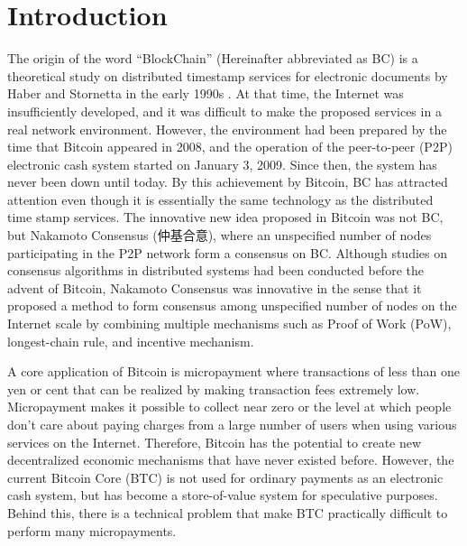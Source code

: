 \documentclass[graybox]{svmult}
\begin{document}
\section{Introduction}
\label{sec:intro}
The origin of the word ``BlockChain'' (Hereinafter abbreviated as BC) is a theoretical study on distributed timestamp services for electronic documents by Haber and Stornetta in the early 1990s
\cite{HS1991,BHS1993,HS1997}.
At that time, the Internet was insufficiently developed, and it was difficult to make the proposed services in a real network environment.
However, the environment had been prepared by the time that Bitcoin \cite{nakamoto} appeared in 2008, and the operation of the peer-to-peer (P2P) electronic cash system started on January 3, 2009.
Since then, the system has never been down until today. 
By this achievement by Bitcoin, BC has attracted attention even though it is essentially the same technology as the distributed time stamp services.
The innovative new idea proposed in Bitcoin was not BC, but Nakamoto Consensus (仲基合意), where an unspecified number of nodes participating in the P2P network form a consensus on BC. 
Although studies on consensus algorithms in distributed systems had been conducted before the advent of Bitcoin, Nakamoto Consensus was innovative in the sense that it proposed a method to form consensus among unspecified number of nodes on the Internet scale by combining multiple mechanisms such as Proof of Work (PoW)\cite{DN1993,JJ1999}, longest-chain rule, and incentive mechanism.


A core application of Bitcoin is micropayment where transactions of less than one yen or cent that can be realized by making transaction fees extremely low. 
Micropayment makes it possible to collect near zero or the level at which people don't care about paying charges from a large number of users when using various services on the Internet. 
Therefore, Bitcoin has the potential to create new decentralized economic mechanisms that have never existed before.
However, the current Bitcoin Core (BTC) \cite{btc} is not used for ordinary payments as an electronic cash system, but has become a store-of-value system for speculative purposes. 
Behind this, there is a technical problem that make BTC practically difficult to perform many micropayments. 
\end{document}
